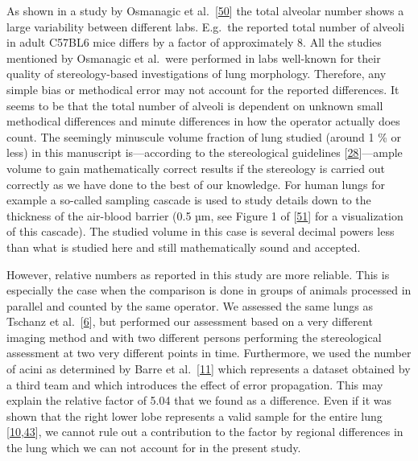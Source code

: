 \documentclass[
  american,
]{article}
\begin{document}
As shown in a study by Osmanagic et al.~{[}\protect\hyperlink{ref-LzalnLBH}{50}{]} the total alveolar number shows a large variability between different labs.
E.g.~the reported total number of alveoli in adult C57BL6 mice differs by a factor of approximately 8.
All the studies mentioned by Osmanagic et al.~were performed in labs well-known for their quality of stereology-based investigations of lung morphology.
Therefore, any simple bias or methodical error may not account for the reported differences.
It seems to be that the total number of alveoli is dependent on unknown small methodical differences and minute differences in how the operator actually does count.
The seemingly minuscule volume fraction of lung studied (around 1 \% or less) in this manuscript is---according to the stereological guidelines {[}\protect\hyperlink{ref-dNc8FfNn}{28}{]}---ample volume to gain mathematically correct results if the stereology is carried out correctly as we have done to the best of our knowledge.
For human lungs for example a so-called sampling cascade is used to study details down to the thickness of the air-blood barrier (0.5 µm, see Figure 1 of {[}\protect\hyperlink{ref-1CLJ32t5m}{51}{]} for a visualization of this cascade).
The studied volume in this case is several decimal powers less than what is studied here and still mathematically sound and accepted.

However, relative numbers as reported in this study are more reliable.
This is especially the case when the comparison is done in groups of animals processed in parallel and counted by the same operator.
We assessed the same lungs as Tschanz et al.~{[}\protect\hyperlink{ref-wnl86DEM}{6}{]}, but performed our assessment based on a very different imaging method and with two different persons performing the stereological assessment at two very different points in time.
Furthermore, we used the number of acini as determined by Barre et al.~{[}\protect\hyperlink{ref-uFNlWogb}{11}{]} which represents a dataset obtained by a third team and which introduces the effect of error propagation.
This may explain the relative factor of 5.04 that we found as a difference.
Even if it was shown that the right lower lobe represents a valid sample for the entire lung {[}\protect\hyperlink{ref-14OP85b2F}{10},\protect\hyperlink{ref-I9TmP6IU}{43}{]}, we cannot rule out a contribution to the factor by regional differences in the lung which we can not account for in the present study.
\end{document}
